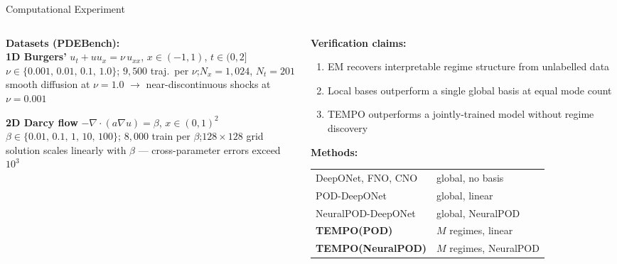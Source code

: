 \documentclass[aspectratio=169]{beamer}
\begin{document}
\begin{frame}{Computational Experiment}

\begin{columns}[T]
\begin{column}{0.52\textwidth}
  \small\textbf{Datasets (PDEBench):}\\[6pt]

  \textbf{1D Burgers'}\enspace
  $u_t + uu_x = \nu\,u_{xx}$,\; $x\in(-1,1)$,\; $t\in(0,2]$\\[2pt]
  $\nu\in\{0.001,\,0.01,\,0.1,\,1.0\}$;\enspace
  $9{,}500$ traj.\ per $\nu$;\enspace $N_x{=}1{,}024$,\; $N_t{=}201$\\[2pt]
  {\footnotesize smooth diffusion at $\nu{=}1.0$ $\to$ near-discontinuous shocks at $\nu{=}0.001$}

  \medskip
  \textbf{2D Darcy flow}\enspace
  $-\nabla\cdot(a\nabla u)=\beta$,\; $x\in(0,1)^2$\\[2pt]
  $\beta\in\{0.01,\,0.1,\,1,\,10,\,100\}$;\enspace
  $8{,}000$ train per $\beta$;\enspace $128{\times}128$ grid\\[2pt]
  {\footnotesize solution scales linearly with $\beta$ — cross-parameter errors exceed $10^3$}
\end{column}
\begin{column}{0.44\textwidth}
  \small\textbf{Verification claims:}
  \begin{enumerate}[1)]
    \item EM recovers interpretable regime structure from unlabelled data
    \item Local bases outperform a single global basis at equal mode count
    \item TEMPO outperforms a jointly-trained model without regime discovery
  \end{enumerate}

  \medskip
  \small\textbf{Methods:}\\[4pt]
  \footnotesize
  \begin{tabular}{ll}
    DeepONet, FNO, CNO            & global, no basis \\
    POD-DeepONet                  & global, linear \\
    NeuralPOD-DeepONet            & global, NeuralPOD \\
    \textcolor{red!70}{\textbf{TEMPO(POD)}}       & $M$ regimes, linear \\
    \textcolor{red!70}{\textbf{TEMPO(NeuralPOD)}} & $M$ regimes, NeuralPOD \\
  \end{tabular}
\end{column}
\end{columns}

\end{frame}
\end{document}
